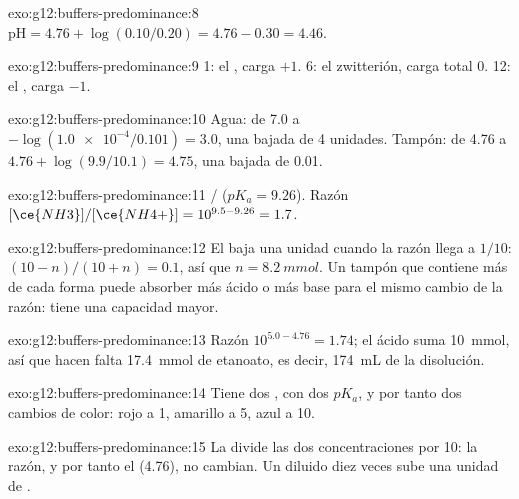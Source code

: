 \begin{solution}{exo:g12:buffers-predominance:8}
$\mathrm{pH} = 4.76 + \log(0.10/0.20) = 4.76 - 0.30 = 4.46$.
\end{solution}

\begin{solution}{exo:g12:buffers-predominance:9}
 1: el  , carga $+1$.  6: el zwitterión,
carga total 0.  12: el  , carga $-1$.
\end{solution}

\begin{solution}{exo:g12:buffers-predominance:10}
Agua: de 7.0 a $-\log(\num{1.0e-4}/0.101) = 3.0$, una bajada de 4
unidades. Tampón: de 4.76 a $4.76 + \log(9.9/10.1) = 4.75$, una bajada de
0.01.
\end{solution}

\begin{solution}{exo:g12:buffers-predominance:11}
/ ($pK_a = 9.26$). Razón
$[\ce{NH3}]/[\ce{NH4+}] = 10^{9.5 - 9.26} = 1.7$.
\end{solution}

\begin{solution}{exo:g12:buffers-predominance:12}
El  baja una unidad cuando la razón llega a $1/10$:
$(10 - n)/(10 + n) = 0.1$, así que $n = \qty{8.2}{mmol}$. Un tampón que
contiene más de cada forma puede absorber más ácido o más base para el
mismo cambio de la razón: tiene una capacidad mayor.
\end{solution}

\begin{solution}{exo:g12:buffers-predominance:13}
Razón $10^{5.0 - 4.76} = 1.74$; el ácido suma \qty{10}{mmol}, así que
hacen falta \qty{17.4}{mmol} de etanoato, es decir, \qty{174}{mL} de la
disolución.
\end{solution}

\begin{solution}{exo:g12:buffers-predominance:14}
Tiene dos , con dos $pK_a$, y por tanto dos cambios de
color: rojo a  1, amarillo a  5, azul a  10.
\end{solution}

\begin{solution}{exo:g12:buffers-predominance:15}
La  divide las dos concentraciones por 10: la razón, y por tanto
el  (4.76), no cambian. Un  diluido diez veces sube una
unidad de .
\end{solution}


